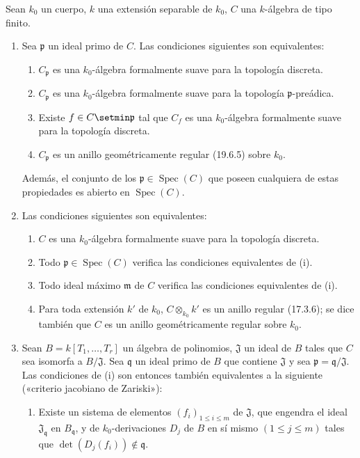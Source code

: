\begin{proposition}[22.6.7]
\label{0.22.6.7-fr}
Sean $k_0$ un cuerpo, $k$ una extensión separable de $k_0$, $C$ una
$k$-álgebra de tipo finito.
\begin{enumerate}
  \item[\rm(i)] Sea $\mathfrak p$ un ideal primo de $C$. Las condiciones
  siguientes son equivalentes:
  \begin{enumerate}
    \item[\textup{a)}] $C_{\mathfrak p}$ es una $k_0$-álgebra formalmente suave para
    la topología discreta.
    \item[\textup{b)}] $C_{\mathfrak p}$ es una $k_0$-álgebra formalmente suave para
    la topología $\mathfrak p$-preádica.
    \item[\textup{c)}] Existe $f\in C\setmin\mathfrak p$ tal que $C_f$ es una
    $k_0$-álgebra formalmente suave para la topología discreta.
    \item[\textup{d)}] $C_{\mathfrak p}$ es un anillo geométricamente regular
    \textup{(19.6.5)} sobre $k_0$.
  \end{enumerate}
  Además, el conjunto de los $\mathfrak p\in\operatorname{Spec}(C)$ que poseen cualquiera de
  estas propiedades es abierto en $\operatorname{Spec}(C)$.
  \item[\rm(ii)] Las condiciones siguientes son equivalentes:
  \begin{enumerate}
    \item[\textup{a)}] $C$ es una $k_0$-álgebra formalmente suave para la topología
    discreta.
    \item[\textup{b)}] Todo $\mathfrak p\in\operatorname{Spec}(C)$ verifica las condiciones
    equivalentes de \textup{(i)}.
    \item[\textup{c)}] Todo ideal máximo $\mathfrak m$ de $C$ verifica las condiciones
    equivalentes de \textup{(i)}.
    \item[\textup{d)}] Para toda extensión $k'$ de $k_0$, $C\otimes_{k_0}k'$ es un
    anillo regular \textup{(17.3.6)}; se dice también que $C$ es un anillo
    geométricamente regular sobre $k_0$.
  \end{enumerate}


  \item[\rm(iii)] Sean $B=k[T_1,\ldots,T_r]$ un álgebra de polinomios,
  $\mathfrak J$ un ideal de $B$ tales que $C$ sea isomorfa a
  $B/\mathfrak J$. Sea $\mathfrak q$ un ideal primo de $B$ que contiene
  $\mathfrak J$ y sea $\mathfrak p=\mathfrak q/\mathfrak J$. Las condiciones
  de \textup{(i)} son entonces también equivalentes a la siguiente \textup{(«criterio jacobiano de
  Zariski»)}:
  \begin{enumerate}
    \item[\textup{e)}] Existe un sistema de elementos
    $(f_i)_{1\leq i\leq m}$ de $\mathfrak J$, que engendra el ideal
    $\mathfrak J_{\mathfrak q}$ en $B_{\mathfrak q}$, y de
    $k_0$-derivaciones $D_j$ de $B$ en sí mismo $(1\leq j\leq m)$ tales que
    $\det(D_j(f_i))\notin\mathfrak q$.
  \end{enumerate}
\end{enumerate}
\end{proposition}

